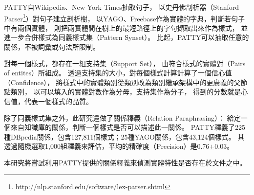 PATTY自Wikipedia、New York Times抽取句子，
以史丹佛剖析器（Stanford Parser\footnote{http://nlp.stanford.edu/software/lex-parser.shtml}）對句子建立剖析樹，
以YAGO、Freebase作為實體的字典，判斷若句子中有兩個實體，
則把兩實體間在樹上的最短路徑上的字句擷取出來作為樣式，
並進一步合併樣式為同義樣式集（Pattern Synset）。
比起\cite{reverb}，PATTY可以抽取任意的關係，不被詞彙或句法所限制。

對每一個樣式，都存在一組支持集（Support Set），
由符合樣式的實體對（Pairs of entites）所組成。
透過支持集的大小，對每個樣式計算計算了一個信心值（Confidence），
將樣式中的實體類別從類別改為類別繼承架構中的更廣義的父節點類別，
以可以填入的實體對數作為分母，支持集作為分子，
得到的分數就是心信值，代表一個樣式的品質。

除了同義樣式集之外，此研究還做了關係釋義（Relation Paraphrasing）：
給定一個來自知識庫的關係，判斷一個樣式是否可以描述此一關係。
PATTY釋義了225種DBpedia關係，包含127,811個樣式；25種YAGO關係，包含43,124個樣式。
其透過隨機選取1,000組釋義來評估，平均的精確度（Precision）是0.76$\pm$0.03。

本研究將嘗試利用PATTY提供的關係釋義來偵測實體特性是否存在於文件之中。   %


